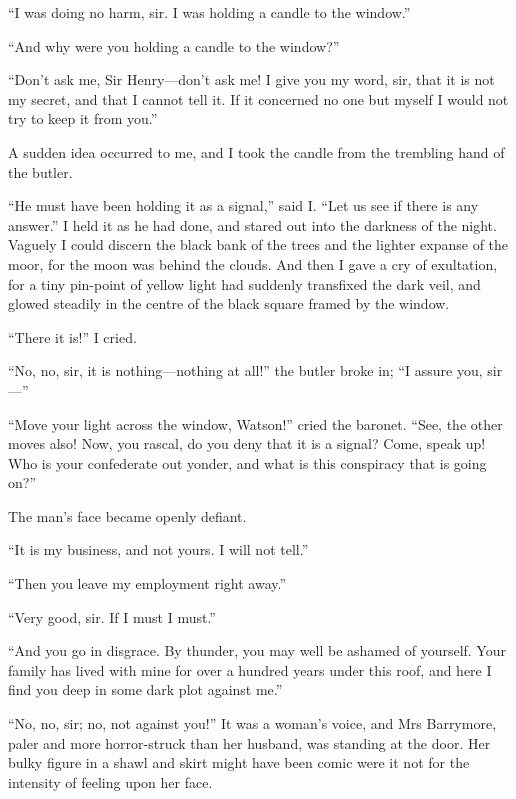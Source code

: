 \documentclass[paper=5.5in:8.5in,BCOR=7mm,twoside,DIV=calc,12pt,usegeometry,openany,chapterprefix,endperiod]{scrbook} %
\begin{document}
\enquote{I was doing no harm, sir. I was holding a candle to the window.}

\enquote{And why were you holding a candle to the window?}

\enquote{Don't ask me, Sir Henry\nobreakdash---don't ask me! I give you my word, sir, that it is not my secret, and that I cannot tell it. If it concerned no one but myself I would not try to keep it from you.}

A sudden idea occurred to me, and I took the candle from the trembling hand of the butler.

\enquote{He must have been holding it as a signal,} said I. \enquote{Let us see if there is any answer.} I held it as he had done, and stared out into the darkness of the night. Vaguely I could discern the black bank of the trees and the lighter expanse of the moor, for the moon was behind the clouds. And then I gave a cry of exultation, for a tiny pin-point of yellow light had suddenly transfixed the dark veil, and glowed steadily in the centre of the black square framed by the window.

\enquote{There it is!} I cried.

\enquote{No, no, sir, it is nothing\nobreakdash---nothing at all!} the butler broke in; \enquote{I assure you, sir\nobreakdash---}

\enquote{Move your light across the window, Watson!} cried the baronet. \enquote{See, the other moves also! Now, you rascal, do you deny that it is a signal? Come, speak up! Who is your confederate out yonder, and what is this conspiracy that is going on?}

The man's face became openly defiant.

\enquote{It is my business, and not yours. I will not tell.}

\enquote{Then you leave my employment right away.}

\enquote{Very good, sir. If I must I must.}

\enquote{And you go in disgrace. By thunder, you may well be ashamed of yourself. Your family has lived with mine for over a hundred years under this roof, and here I find you deep in some dark plot against me.}

\enquote{No, no, sir; no, not against you!} It was a woman's voice, and Mrs Barrymore, paler and more horror-struck than her husband, was standing at the door. Her bulky figure in a shawl and skirt might have been comic were it not for the intensity of feeling upon her face.
\end{document}
